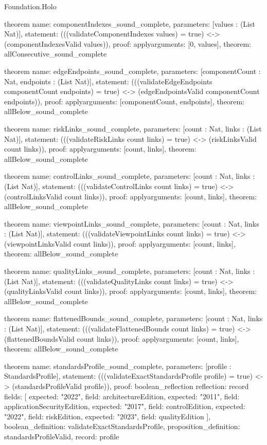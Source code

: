 \begin{lexlean}{Foundation.Holo}
\begin{semanticmodule}
theorem{
  name: componentIndexes_sound_complete,
  parameters: [values : (List Nat)],
  statement: (((validateComponentIndexes values) = true) <-> (componentIndexesValid values)),
  proof: apply{arguments: [0, values], theorem: allConsecutive_sound_complete}
}

theorem{
  name: edgeEndpoints_sound_complete,
  parameters: [componentCount : Nat, endpoints : (List Nat)],
  statement: (((validateEdgeEndpoints componentCount endpoints) = true) <-> (edgeEndpointsValid componentCount endpoints)),
  proof: apply{arguments: [componentCount, endpoints], theorem: allBelow_sound_complete}
}

theorem{
  name: riskLinks_sound_complete,
  parameters: [count : Nat, links : (List Nat)],
  statement: (((validateRiskLinks count links) = true) <-> (riskLinksValid count links)),
  proof: apply{arguments: [count, links], theorem: allBelow_sound_complete}
}

theorem{
  name: controlLinks_sound_complete,
  parameters: [count : Nat, links : (List Nat)],
  statement: (((validateControlLinks count links) = true) <-> (controlLinksValid count links)),
  proof: apply{arguments: [count, links], theorem: allBelow_sound_complete}
}

theorem{
  name: viewpointLinks_sound_complete,
  parameters: [count : Nat, links : (List Nat)],
  statement: (((validateViewpointLinks count links) = true) <-> (viewpointLinksValid count links)),
  proof: apply{arguments: [count, links], theorem: allBelow_sound_complete}
}

theorem{
  name: qualityLinks_sound_complete,
  parameters: [count : Nat, links : (List Nat)],
  statement: (((validateQualityLinks count links) = true) <-> (qualityLinksValid count links)),
  proof: apply{arguments: [count, links], theorem: allBelow_sound_complete}
}

theorem{
  name: flattenedBounds_sound_complete,
  parameters: [count : Nat, links : (List Nat)],
  statement: (((validateFlattenedBounds count links) = true) <-> (flattenedBoundsValid count links)),
  proof: apply{arguments: [count, links], theorem: allBelow_sound_complete}
}

theorem{
  name: standardsProfile_sound_complete,
  parameters: [profile : StandardsProfile],
  statement: (((validateExactStandardsProfile profile) = true) <-> (standardsProfileValid profile)),
  proof: boolean_reflection{
    reflection: record{
      fields: [
        {expected: "2022", field: architectureEdition},
        {expected: "2011", field: applicationSecurityEdition},
        {expected: "2017", field: controlEdition},
        {expected: "2022", field: riskEdition},
        {expected: "2023", field: qualityEdition}
      ],
      boolean_definition: validateExactStandardsProfile,
      proposition_definition: standardsProfileValid,
      record: profile
    }
  }
}


\end{semanticmodule}
\end{lexlean}
